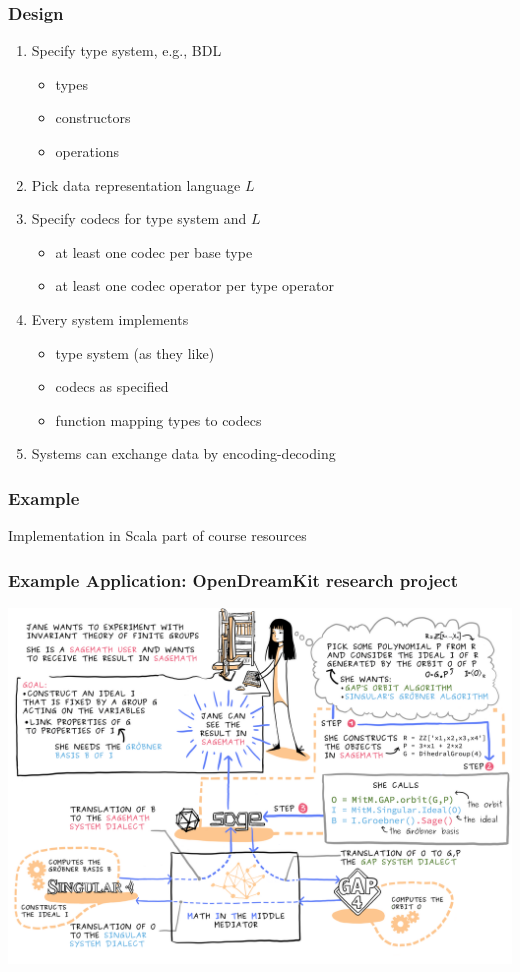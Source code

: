 \begin{frame}\frametitle{Design}
\begin{enumerate}
\item Specify type system, e.g., BDL
 \begin{itemize}
 \item types
 \item constructors
 \item operations
 \end{itemize}
\item Pick data representation language $L$
\item Specify codecs for type system and $L$
 \begin{itemize}
 \item at least one codec per base type
 \item at least one codec operator per type operator
 \end{itemize}
\item Every system implements
 \begin{itemize}
 \item type system (as they like)
 \item codecs as specified
 \item function mapping types to codecs
 \end{itemize}
\item Systems can exchange data by encoding-decoding
\end{enumerate}
\end{frame}

\begin{frame}\frametitle{Example}
Implementation in Scala part of course resources
\end{frame}

\begin{frame}\frametitle{Example Application: OpenDreamKit research project}
\includegraphics[width=\textwidth]{MitM.png}
\end{frame}

